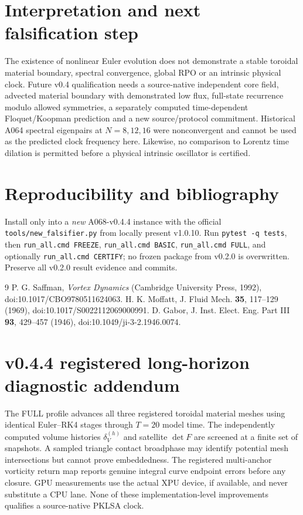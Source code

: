 \documentclass[11pt,a4paper]{article}
\begin{document}

\section{Interpretation and next falsification step}
The existence of nonlinear Euler evolution does not demonstrate a stable toroidal material boundary, spectral convergence, global RPO or an intrinsic physical clock. Future v0.4 qualification needs a source-native independent core field, advected material boundary with demonstrated low flux, full-state recurrence modulo allowed symmetries, a separately computed time-dependent Floquet/Koopman prediction and a new source/protocol commitment. Historical A064 spectral eigenpairs at $N=8,12,16$ were nonconvergent and cannot be used as the predicted clock frequency here. Likewise, no comparison to Lorentz time dilation is permitted before a physical intrinsic oscillator is certified.

\section{Reproducibility and bibliography}
Install only into a \emph{new} A068-v0.4.4 instance with the official \texttt{tools/new\_falsifier.py} from locally present v1.0.10. Run \texttt{pytest -q tests}, then \texttt{run\_all.cmd FREEZE}, \texttt{run\_all.cmd BASIC}, \texttt{run\_all.cmd FULL}, and optionally \texttt{run\_all.cmd CERTIFY}; no frozen package from v0.2.0 is overwritten. Preserve all v0.2.0 result evidence and commits.\par
\begin{thebibliography}{9}
 P. G. Saffman, \emph{Vortex Dynamics} (Cambridge University Press, 1992), doi:10.1017/CBO9780511624063.
 H. K. Moffatt, J. Fluid Mech. \textbf{35}, 117--129 (1969), doi:10.1017/S0022112069000991.
 D. Gabor, J. Inst. Elect. Eng. Part III \textbf{93}, 429--457 (1946), doi:10.1049/ji-3-2.1946.0074.
\end{thebibliography}
\section{v0.4.4 registered long-horizon diagnostic addendum}
The FULL profile advances all three registered toroidal material meshes using
identical Euler--RK4 stages through $T=20$ model time. The independently
computed volume histories $\delta_V^{(h)}$ and satellite $\det F$ are
screened at a finite set of snapshots. A sampled triangle contact broadphase
may identify potential mesh intersections but cannot prove embeddedness.
The registered multi-anchor vorticity return map reports genuine integral
curve endpoint errors before any closure. GPU measurements use the actual XPU
device, if available, and never substitute a CPU lane. None of these
implementation-level improvements qualifies a source-native PKLSA clock.
\end{document}
